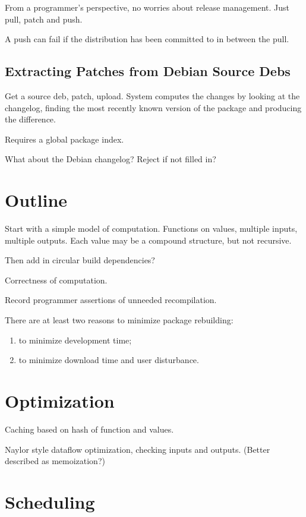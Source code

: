 \documentclass[12pt]{article}
\begin{document}
From a programmer's perspective, no worries about release management.
Just pull, patch and push.

A push can fail if the distribution has been committed to in between
the pull.

\subsection{Extracting Patches from Debian Source Debs}

Get a source deb, patch, upload.  System computes the changes by
looking at the changelog, finding the most recently known version of
the package and producing the difference.

Requires a global package index.

What about the Debian changelog?  Reject if not filled in?

\section{Outline}

Start with a simple model of computation.
Functions on values, multiple inputs, multiple outputs.
Each value may be a compound structure, but not recursive.

Then add in circular build dependencies?

Correctness of computation.

Record programmer assertions of unneeded recompilation.

There are at least two reasons to minimize package rebuilding:
\begin{enumerate}
  \item to minimize development time;
  \item to minimize download time and user disturbance.
\end{enumerate}


\section{Optimization}

Caching based on hash of function and values.

Naylor style dataflow optimization, checking inputs and
outputs. (Better described as memoization?)

\section{Scheduling}
\end{document}
